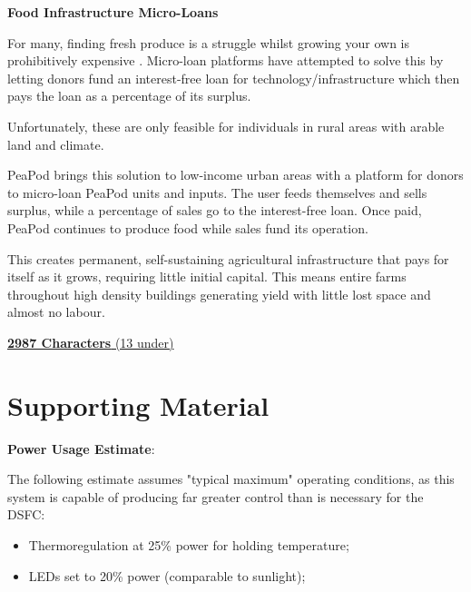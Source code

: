 \documentclass{report}
\begin{document}


\textbf{Food Infrastructure Micro-Loans}

For many, finding fresh produce is a struggle whilst growing your own is prohibitively expensive \cite{foodsecurity}. Micro-loan platforms have attempted to solve this by letting donors fund an interest-free loan for technology/infrastructure which then pays the loan as a percentage of its surplus. 

Unfortunately, these are only feasible for individuals in rural areas with arable land and climate.

PeaPod brings this solution to low-income urban areas with a platform for donors to micro-loan PeaPod units and inputs. The user feeds themselves and sells surplus, while a percentage of sales go to the interest-free loan. Once paid, PeaPod continues to produce food while sales fund its operation. 

This creates permanent, self-sustaining agricultural infrastructure that pays for itself as it grows, requiring little initial capital. This means entire farms throughout high density buildings generating yield with little lost space and almost no labour.

\uline{\textbf{2987 Characters} (13 under)}

\newpage

\appendix

\section{Supporting Material}

\textbf{Power Usage Estimate}:

The following estimate assumes "typical maximum" operating conditions, as this system is capable of producing far greater control than is necessary for the DSFC:
\begin{itemize}
    \item Thermoregulation at 25\% power for holding temperature;
    \item LEDs set to 20\% power (comparable to sunlight);
\end{itemize}
\end{document}
